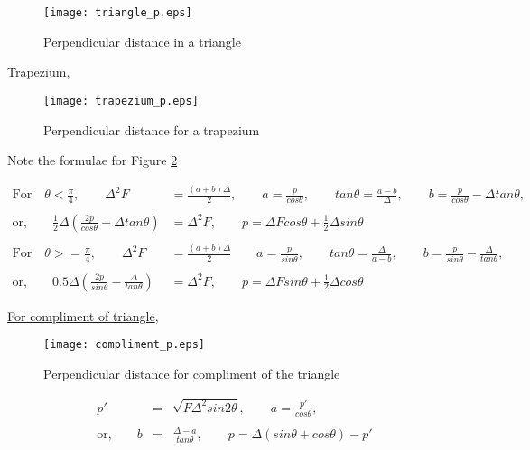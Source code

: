 \begin{figure}
\centering
 \texttt{[image: triangle\_p.eps]}
 \caption{Perpendicular distance in a triangle}
 \label{Fig:trianlge_p}
\end{figure}

\underline{Trapezium}, \\
  \begin{figure}
  \centering
    \texttt{[image: trapezium\_p.eps]}
    \caption{Perpendicular distance for a trapezium}
    \label{Fig:trapezium_p}
  \end{figure}
  Note the formulae for Figure \ref{Fig:trapezium_p}
  
  \begin{equation*}
  \begin{aligned}  
     \text{For} \quad \theta  < \frac{\pi}{4}, 
    \qquad  \Delta^2 F &=\frac{(a+b)\Delta}{2},
    \qquad a=\frac{p}{cos\theta},
      \qquad tan\theta=\frac{a-b}{\Delta},
      \qquad b=\frac{p}{cos\theta}-\Delta tan\theta, \\
      \\
      \text{or,}\qquad \frac{1}{2}\Delta\left(\frac{2p}{cos\theta}-\Delta tan\theta\right)&=\Delta^2 F,
      \qquad \boxed{p=\Delta Fcos\theta+\frac{1}{2}\Delta sin\theta} \\
      \\
\text{For} \quad \theta  >= \frac{\pi}{4},
\qquad
\Delta^2 F &=\frac{(a+b)\Delta}{2}
\qquad
a=\frac{p}{sin\theta},
\qquad
tan\theta=\frac{\Delta}{a-b},
\qquad
b=\frac{p}{sin\theta}-\frac{\Delta}{tan\theta},\\
\\
\text{or,}\qquad 0.5\Delta\left(\frac{2p}{sin\theta}-\frac{\Delta}{tan\theta}\right)&=\Delta^2 F,
\qquad
\boxed{p=\Delta Fsin\theta+\frac{1}{2}\Delta cos\theta}
\end{aligned}
  \end{equation*}
  
\underline{For compliment of triangle},
\begin{figure}[H]
\centering
 \texttt{[image: compliment\_p.eps]}
 \caption{Perpendicular distance for compliment of the triangle}
\end{figure}

\begin{equation*}
\begin{align}
 p'&=&\sqrt{F\Delta^2sin2\theta},
\qquad a=\frac{p'}{cos\theta},\\
\\
\text{or,}\qquad b&=&\frac{\Delta-a}{tan\theta},
\qquad \boxed{p=\Delta(sin\theta+cos\theta)-p'}
\end{align}
\end{equation*}

